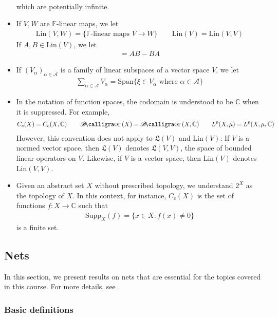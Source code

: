 \documentclass[12pt,b5paper,notitlepage]{article}
\theoremstyle{definition}
\theoremstyle{plain}
\DeclareMathOperator{\Bor}{\mathscr{B}\text{\kern -2pt {\calligra\large or}}\,}
\newcommand{\fk}{\mathfrak}
\newcommand{\Span}{\mathrm{Span}}
\newcommand{\scr}{\mathscr}
\newcommand{\Cbb}{\mathbb C}
\newcommand{\Supp}{\mathrm{Supp}}
\newcommand{\Fbb}{\mathbb F}
\newcommand{\Lin}{\mathrm{Lin}}
\numberwithin{equation}{section}
\begin{document}
\begin{itemize}
\begin{gather*}
\end{gather*}
which are potentially infinite.
\item If $V,W$ are $\Fbb$-linear maps, we let
\begin{align*}
\Lin(V,W)=\{\text{$\Fbb$-linear maps }V\rightarrow W\}\qquad \Lin(V)=\Lin(V,V)
\end{align*}
If $A,B\in\Lin(V)$, we let
\begin{align*}
[A,B]=AB-BA
\end{align*}
\item If $(V_\alpha)_{\alpha\in\scr A}$ is a family of linear subspaces of a vector space $V$, we let
\begin{align*}
\sum_{\alpha\in\scr A}V_\alpha=\Span\{\xi\in V_\alpha\text{ where }\alpha\in\scr A\}
\end{align*}
\item In the notation of function spaces, the codomain is understood to be $\Cbb$ when it is suppressed. For example,
\begin{gather*}
C_c(X)=C_c(X,\Cbb)\qquad \Bor(X)=\Bor(X,\Cbb)\qquad L^p(X,\mu)=L^p(X,\mu,\Cbb)
\end{gather*}
However, this convention does not apply to $\fk L(V)$ and $\Lin(V)$: If $V$ is a normed vector space, then $\fk L(V)$ denotes $\fk L(V,V)$, the space of bounded linear operators on $V$. Likewise, if $V$ is a vector space, then $\Lin(V)$ denotes $\Lin(V,V)$.
\item Given an abstract set $X$ without prescribed topology, we understand $2^X$ as the topology of $X$. In this context, for instance, $C_c(X)$ is the set of functions $f:X\rightarrow\Cbb$ such that
\begin{align}\label{eq201}
\Supp_X(f)=\{x\in X:f(x)\neq0\}
\end{align}
is a finite set. 
\end{itemize}



\subsection{Nets}


In this section, we present results on nets that are essential for the topics covered in this course. For more details, see \cite{Gui-A}.

\subsubsection{Basic definitions}
\end{document}
